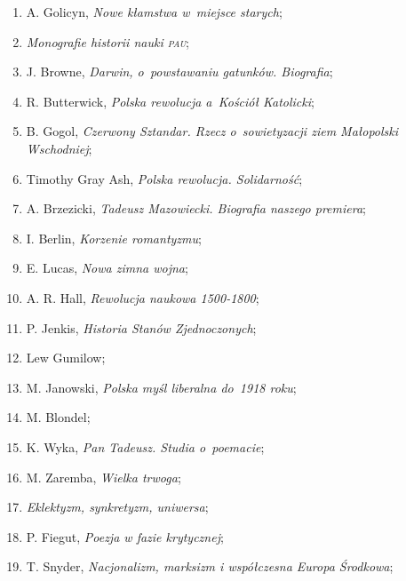 \documentclass[a4paper,11pt]{article}
\begin{document}
\begin{enumerate}
\item A. Golicyn, \textit{Nowe kłamstwa w~miejsce starych};

\item \textit{Monografie historii nauki \textsc{pau}};

\item J. Browne, \textit{Darwin, o~powstawaniu gatunków. Biografia};

\item R. Butterwick, \textit{Polska rewolucja a~Kościół Katolicki};

\item B. Gogol, \textit{Czerwony Sztandar. Rzecz o~sowietyzacji ziem
    Małopolski Wschodniej};

\item Timothy Gray Ash, \textit{Polska rewolucja. Solidarność};

\item A. Brzezicki, \textit{Tadeusz Mazowiecki. Biografia naszego
    premiera};

\item I. Berlin, \textit{Korzenie romantyzmu};

\item E. Lucas, \textit{Nowa zimna wojna};

\item A. R. Hall, \textit{Rewolucja naukowa 1500-1800};

\item P. Jenkis, \textit{Historia Stanów Zjednoczonych};

\item Lew Gumilow;

\item M. Janowski, \textit{Polska myśl liberalna do~1918 roku};

\item M. Blondel;

\item K. Wyka, \textit{Pan Tadeusz. Studia o~poemacie};

\item M. Zaremba, \textit{Wielka trwoga};

\item \textit{Eklektyzm, synkretyzm, uniwersa};

\item P. Fiegut, \textit{Poezja w fazie krytycznej};

\item T. Snyder, \textit{Nacjonalizm, marksizm i współczesna Europa
    Środkowa};


\end{enumerate}
\end{document}
